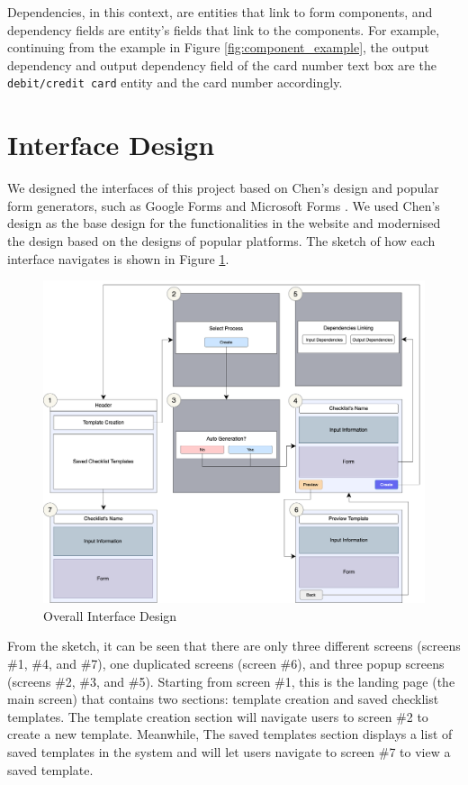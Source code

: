 Dependencies, in this context, are entities that link to form components, and dependency fields are entity's fields that link to the components. For example, continuing from the example in Figure \ref{fig:component_example}, the output dependency and output dependency field of the card number text box are the \verb!debit/credit card! entity and the card number accordingly.




\section{Interface Design}
\label{interface_design}
We designed the interfaces of this project based on Chen's design \cite{checklistdesign} and popular form generators, such as Google Forms \cite{googleforms} and Microsoft Forms \cite{msforms}. We used Chen's design as the base design for the functionalities in the website and modernised the design based on the designs of popular platforms. The sketch of how each interface navigates is shown in Figure \ref{fig:overall_interface_design}.

\begin{figure}[ht!]
    \centering
    \includegraphics[width=\textwidth]{overleaf/images/overall_interface_design.png}
    \caption{Overall Interface Design}
    \label{fig:overall_interface_design}
\end{figure}

From the sketch, it can be seen that there are only three different screens (screens \#1, \#4, and \#7), one duplicated screens (screen \#6), and three popup screens (screens \#2, \#3, and \#5). Starting from screen \#1, this is the landing page (the main screen) that contains two sections: template creation and saved checklist templates. The template creation section will navigate users to screen \#2 to create a new template. Meanwhile, The saved templates section displays a list of saved templates in the system and will let users navigate to screen \#7 to view a saved template.

